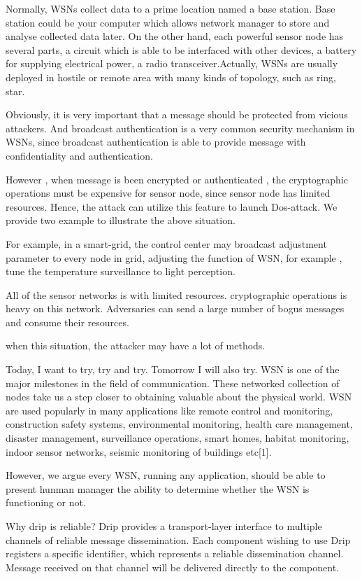 \documentclass[lnicst,sechang,a4paper]{svmultln}
\begin{document}
Normally, WSNs collect data to a prime location named a base station. Base station could be your computer which allows network manager to store and analyse collected data later. On the other hand, each powerful sensor node has several parts, a circuit which is able to be interfaced with other devices, a battery for supplying electrical power, a radio transceiver.Actually, WSNs are usually deployed in hostile or remote area with many kinds of topology, such as ring, star. 

Obviously, it is very important that a message should be protected from vicious attackers. And broadcast authentication is a very common security mechanism in WSNs, since broadcast authentication is able to provide message with confidentiality and authentication. 

However , when message is been encrypted or authenticated , the cryptographic operations must be expensive for sensor node, since sensor node has limited  resources.  Hence, the attack can utilize this feature to launch Dos-attack.
We provide two example to illustrate the above situation.

For example, in a smart-grid, the control center may broadcast adjustment parameter to every node in grid, adjusting the function of WSN, for example , tune the temperature surveillance to light perception. 

All of the sensor networks is with limited resources. cryptographic operations is heavy on this network. Adversaries can send a large number of bogus messages and consume their resources.

when this situation, the attacker may have a lot of methods.

Today, I want to try, try and try. Tomorrow I will also try.
WSN is one of the major milestones in the field of communication. These networked collection of nodes take us a step closer to obtaining valuable about the physical world. WSN are used popularly in many applications like remote control and monitoring, construction safety systems, environmental monitoring, health care management, disaster management, surveillance operations, smart homes, habitat monitoring, indoor sensor networks, seismic monitoring of buildings etc[1].

However, we argue every WSN, running any application, should be able to present hunman manager the ability to determine whether the WSN is functioning or not.

Why drip is reliable?
Drip provides a transport-layer interface to multiple channels of reliable message dissemination. Each component wishing to use Drip registers a specific identifier, which represents a reliable dissemination channel. Message received on that channel will be delivered directly to the component.
\end{document}
